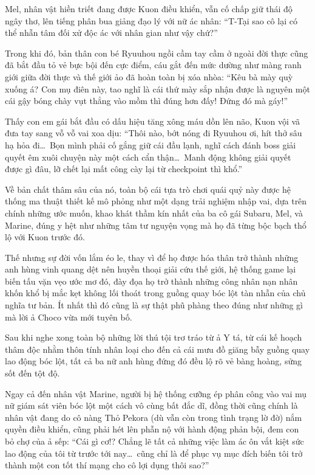 \documentclass[../main.tex]{subfiles}
\begin{document}
Mel, nhân vật hiền triết đang được Kuon điều khiển, vẫn cố chấp giữ thái độ ngây thơ, lên tiếng phân bua giảng đạo lý với nữ ác nhân: ``T-Tại sao cô lại có thể nhẫn tâm đối xử độc ác với nhân gian như vậy chứ?''

Trong khi đó, bản thân con bé Ryuuhou ngồi cầm tay cầm ở ngoài đời thực cũng đã bắt đầu tỏ vẻ bực bội đến cực điểm, cáu gắt đến mức dường như màng ranh giới giữa đời thực và thế giới ảo đã hoàn toàn bị xóa nhòa: ``Kêu bà mày quỳ xuống á? Con mụ điên này, tao nghĩ là cái thứ mày sắp nhận được là nguyên một cái gậy bóng chày vụt thẳng vào mồm thì đúng hơn đấy! Đứng đó mà gáy!''

Thấy con em gái bắt đầu có dấu hiệu tăng xông máu dồn lên não, Kuon vội vã đưa tay sang vỗ vỗ vai xoa dịu: ``Thôi nào, bớt nóng đi Ryuuhou ơi, hít thở sâu hạ hỏa đi\dots\ Bọn mình phải cố gắng giữ cái đầu lạnh, nghĩ cách đánh boss giải quyết êm xuôi chuyện này một cách cẩn thận\dots\ Manh động không giải quyết được gì đâu, lỡ chết lại mất công cày lại từ checkpoint thì khổ.''

Về bản chất thâm sâu của nó, toàn bộ cái tựa trò chơi quái quỷ này được hệ thống ma thuật thiết kế mô phỏng như một dạng trải nghiệm nhập vai, dựa trên chính những ước muốn, khao khát thầm kín nhất của ba cô gái Subaru, Mel, và Marine, đúng y hệt như những tâm tư nguyện vọng mà họ đã từng bộc bạch thổ lộ với Kuon trước đó.

Thế nhưng sự đời vốn lắm éo le, thay vì để họ được hóa thân trở thành những anh hùng vinh quang dệt nên huyền thoại giải cứu thế giới, hệ thống game lại biến tấu vặn vẹo ước mơ đó, đày đọa họ trở thành những công nhân nạn nhân khốn khổ bị mắc kẹt không lối thoát trong guồng quay bóc lột tàn nhẫn của chủ nghĩa tư bản. Ít nhất thì đó cũng là sự thật phũ phàng theo đúng như những gì mà lời ả Choco vừa mới tuyên bố.

Sau khi nghe xong toàn bộ những lời thú tội trơ tráo từ ả Y tá, từ cái kế hoạch thâm độc nhằm thôn tính nhân loại cho đến cả cái mưu đồ giăng bẫy guồng quay lao động bóc lột, tất cả ba nữ anh hùng đứng đó đều lộ rõ vẻ bàng hoàng, sửng sốt đến tột độ.

Ngay cả đến nhân vật Marine, người bị hệ thống cưỡng ép phân công vào vai mụ nữ giám sát viên bóc lột một cách vô cùng bất đắc dĩ, đồng thời cũng chính là nhân vật đang do cô nàng Thỏ Pekora (dù vẫn còn trong tình trạng lờ đờ) nắm quyền điều khiển, cũng phải hét lên phẫn nộ với hành động phản bội, đem con bỏ chợ của ả sếp: ``Cái gì cơ!? Chẳng lẽ tất cả những việc làm ác ôn vắt kiệt sức lao động của tôi từ trước tới nay\dots\ cũng chỉ là để phục vụ mục đích biến tôi trở thành một con tốt thí mạng cho cô lợi dụng thôi sao?''
\end{document}
